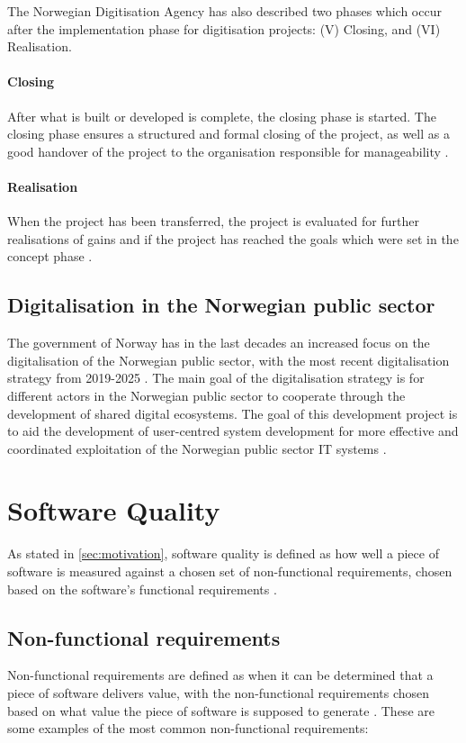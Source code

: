 The Norwegian Digitisation Agency has also described two phases which occur after the implementation phase for digitisation projects: (V) Closing, and (VI) Realisation.

\paragraph{Closing}
After what is built or developed is complete, the closing phase is started. The closing phase ensures a structured and formal closing of the project, as well as a good handover of the project to the organisation responsible for manageability \cite{project_wizard_digdir_2023}. 

\paragraph{Realisation}
When the project has been transferred, the project is evaluated for further realisations of gains and if the project has reached the goals which were set in the concept phase \cite{project_wizard_digdir_2023}.

\subsection{Digitalisation in the Norwegian public sector}
The government of Norway has in the last decades an increased focus on the digitalisation of the Norwegian public sector, with the most recent digitalisation strategy from 2019-2025 \cite{r_2019}. The main goal of the digitalisation strategy is for different actors in the Norwegian public sector to cooperate through the development of shared digital ecosystems. The goal of this development project is to aid the development of user-centred system development for more effective and coordinated exploitation of the Norwegian public sector IT systems \cite{r_2019}.

\section{Software Quality} \label{sec:software_quality}
As stated in \autoref{sec:motivation}, software quality is defined as how well a piece of software is measured against a chosen set of non-functional requirements, chosen based on the software's functional requirements \cite{iso_25010:2011}. 

\subsection{Non-functional requirements} \label{sec:non_functional_requirments_case_bg}
Non-functional requirements are defined as when it can be determined that a piece of software delivers value, with the non-functional requirements chosen based on what value the piece of software is supposed to generate \cite{iso_25010:2011}. These are some examples of the most common non-functional requirements:

